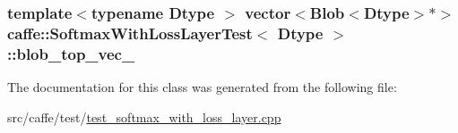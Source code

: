 \hypertarget{classcaffe_1_1_softmax_with_loss_layer_test_a89408418439c9e11ef924b1c932980cd}{
\subsubsection[{blob\+\_\+top\+\_\+vec\+\_\+}]{\setlength{\rightskip}{0pt plus 5cm}template$<$typename Dtype $>$ vector$<${\bf Blob}$<$Dtype$>$$\ast$$>$ {\bf caffe\+::\+Softmax\+With\+Loss\+Layer\+Test}$<$ Dtype $>$\+::blob\+\_\+top\+\_\+vec\+\_\+\hspace{0.3cm}{\ttfamily [protected]}}}\label{classcaffe_1_1_softmax_with_loss_layer_test_a89408418439c9e11ef924b1c932980cd}


The documentation for this class was generated from the following file\+:\begin{DoxyCompactItemize}
\item 
src/caffe/test/\hyperlink{test__softmax__with__loss__layer_8cpp}{test\+\_\+softmax\+\_\+with\+\_\+loss\+\_\+layer.\+cpp}\end{DoxyCompactItemize}
